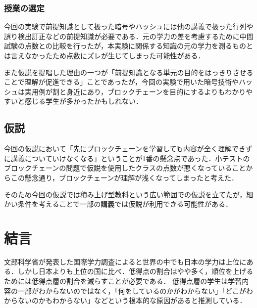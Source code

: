 \documentclass[a4j,12pt]{jsarticle}
\begin{document}
\begin{table}[H]
\centering
{}
\caption{前提知識を用いた単元の平均点の比較}
\label{fig:test5}
\end{table}

\subsubsection{授業の選定}
今回の実験で前提知識として扱った暗号やハッシュには他の講義で扱った行列や誤り検出訂正などの前提知識が必要である．元の学力の差を考慮するために中間試験の点数との比較を行ったが，本実験に関係する知識の元の学力を測るものとは言えなかったため点数にズレが生じてしまった可能性がある．

また仮説を提唱した理由の一つが「前提知識となる単元の目的をはっきりさせることで理解が促進できる」ことであったが，今回の実験で用いた暗号技術やハッシュは実用例が割と身近にあり，ブロックチェーンを目的にするよりもわかりやすいと感じる学生が多かったかもしれない．

\newpage
\subsection{仮説}
今回の仮説において「先にブロックチェーンを学習しても内容が全く理解できずに講義についていけなくなる」ということが1番の懸念点であった．小テストのブロックチェーンの問題で仮説を使用したクラスの点数が悪くなっていることからこの懸念通り，ブロックチェーンが理解が浅くなってしまったと考えた．

そのため今回の仮説では積み上げ型教科という広い範囲での仮説を立てたが，細かい条件を考えることで一部の講義では仮説が利用できる可能性がある．

\newpage
\section{結言}
文部科学省が発表した国際学力調査によると世界の中でも日本の学力は上位にある．しかし日本よりも上位の国に比べ．低得点の割合はやや多く，順位を上げるためには低得点層の割合を減らすことが必要である．
低得点層の学生は学習内容の一部がわからないのではなく，「何をしているのかがわからない」「どこがわからないのかもわからない」などという根本的な原因があると推測している．
\end{document}
